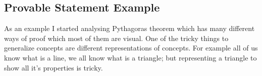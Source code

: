 \documentclass{article}
\begin{document}
\subsection*{Provable Statement Example}

As an example I started analysing Pythagoras theorem which has many different ways of proof which most of them are visual. One of the tricky things to generalize concepts are different representations of concepts. For example all of us know what is a line, we all know what is a triangle; but representing a triangle to show all it's properties is tricky.






% 

% 

\end{document}
